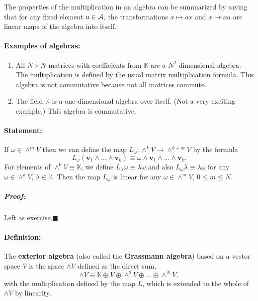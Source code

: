 The properties of the multiplication in an algebra can be summarized
by saying that for any fixed element $a\in{\cal A}$, the transformations
$x\mapsto ax$ and $x\mapsto xa$ are linear maps of the algebra into
itself.


\paragraph{Examples of algebras:}
\begin{enumerate}
\item All $N\times N$ matrices with coefficients from $\mathbb{K}$ are
a $N^{2}$-dimen\-sion\-al algebra. The multiplication is defined
by the usual matrix multiplication formula. This algebra is not commutative
because not all matrices commute. 
\item The field $\mathbb{K}$ is a one-dimen\-sion\-al algebra over itself.
(Not a very exciting example.) This algebra is commutative.
\end{enumerate}

\paragraph{Statement:}

If $\omega\in\wedge^{m}V$ then we can define the map $L_{\omega}:\wedge^{k}V\rightarrow\wedge^{k+m}V$
by the formula\[
L_{\omega}\left(\mathbf{v}_{1}\wedge...\wedge\mathbf{v}_{k}\right)\equiv\omega\wedge\mathbf{v}_{1}\wedge...\wedge\mathbf{v}_{k}.\]
For elements of $\wedge^{0}V\equiv\mathbb{K}$, we define $L_{\lambda}\omega\equiv\lambda\omega$
and also $L_{\omega}\lambda\equiv\lambda\omega$ for any $\omega\in\wedge^{k}V$,
$\lambda\in\mathbb{K}$. Then the map $L_{\omega}$ is linear for
any $\omega\in\wedge^{m}V$, $0\leq m\leq N$.


\subparagraph{Proof: }

Left as exercise.\hfill{}$\blacksquare$


\paragraph{Definition: }

The \textbf{exterior algebra} (also called
the \textbf{Grassmann algebra}) based on
a vector space $V$ is the space $\wedge V$ defined as the direct
sum, \[
\wedge V\equiv\mathbb{K}\oplus V\oplus\wedge^{2}V\oplus...\oplus\wedge^{N}V,\]
with the multiplication defined by the map $L$, which is extended
to the whole of $\wedge V$ by linearity.

